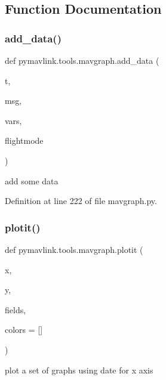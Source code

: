 \subsection{Function Documentation}
\mbox{\label{namespacepymavlink_1_1tools_1_1mavgraph_a798da2b2c7d6fe51f1eecc3dcba95079}} 
\subsubsection{\texorpdfstring{add\_data()}{add\_data()}}
{\footnotesize\ttfamily def pymavlink.\+tools.\+mavgraph.\+add\+\_\+data (\begin{DoxyParamCaption}\item[{}]{t,  }\item[{}]{msg,  }\item[{}]{vars,  }\item[{}]{flightmode }\end{DoxyParamCaption})}

\begin{DoxyVerb}add some data\end{DoxyVerb}
 

Definition at line 222 of file mavgraph.\+py.

\mbox{\label{namespacepymavlink_1_1tools_1_1mavgraph_ac4c25ed1ed8661bb69619e15992c1c81}} 
\subsubsection{\texorpdfstring{plotit()}{plotit()}}
{\footnotesize\ttfamily def pymavlink.\+tools.\+mavgraph.\+plotit (\begin{DoxyParamCaption}\item[{}]{x,  }\item[{}]{y,  }\item[{}]{fields,  }\item[{}]{colors = {\ttfamily \mbox{[}\mbox{]}} }\end{DoxyParamCaption})}

\begin{DoxyVerb}plot a set of graphs using date for x axis\end{DoxyVerb}
 

